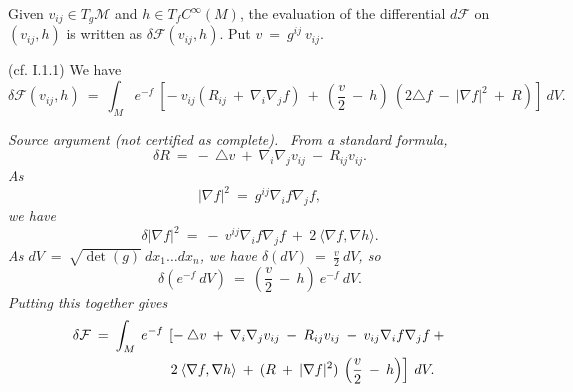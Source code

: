 Given $v_{ij} \in T_g{\mathcal M}$ and $h \in T_f C^\infty(M)$, the
evaluation of the differential $d{\mathcal F}$ on $(v_{ij}, h)$ is
written as $\delta {\mathcal F}(v_{ij}, h)$.
Put $v \: = \: g^{ij} \: v_{ij}$.
\begin{proposition}
  \label{prop:kl-f-entropy-first-variation-f-entropy}
 (cf. I.1.1)
We have
\begin{equation}
\delta {\mathcal F}(v_{ij}, h) \: = \:
\int_M e^{-f} \: \left[ - \: v_{ij}
(R_{ij} \: + \: \nabla_i \nabla_j f) \: + \:
\left( \frac{v}{2} \: - \: h \right) \: (2 \triangle f \: - \:
|\nabla f|^2 \: + \: R) \right] \: dV.
\end{equation}
\end{proposition}
\par\medskip\noindent\textit{Source argument (not certified as complete).}\ \begingroup\itshape
From a standard formula,
\begin{equation}
\delta R \: = \: - \: \triangle v \: + \: \nabla_i \nabla_j v_{ij}
\: - \: R_{ij} v_{ij}.
\end{equation}
As
\begin{equation}
|\nabla f|^2 \: = \: g^{ij} \nabla_i f \nabla_j f,
\end{equation}
we have
\begin{equation}
\delta |\nabla f|^2 \: = \: - \: v^{ij} \nabla_i f \nabla_j f
\: + \: 2 \: \langle \nabla f, \nabla h \rangle.
\end{equation}
As $dV \: = \: \sqrt{\det(g)} \: dx_1 \ldots dx_n$, we have
$\delta (dV) \: = \: \frac{v}{2} \: dV$, so
\begin{equation} \label{measvar}
\delta \left( e^{-f} \: dV \right) \: = \: \left( \frac{v}{2} \: - \: h
\right) \: e^{-f} \: dV.
\end{equation}
Putting this together gives
\begin{align} \label{putting}
\delta {\mathcal F} \: = \:
\int_M \:  e^{-f} \: & \left[  - \: \triangle v \: + \:
\nabla_i \nabla_j v_{ij} \: - \: R_{ij} v_{ij} \: - \:
v_{ij} \nabla_i f \nabla_j f \: + \right. \\
& \left.  2 \: \langle \nabla f, \nabla h \rangle
\: + \: (R \: + \: |\nabla f|^2 ) \: \left( \frac{v}{2} \: - \: h \right)
\right] \:  dV. \notag
\end{align}

